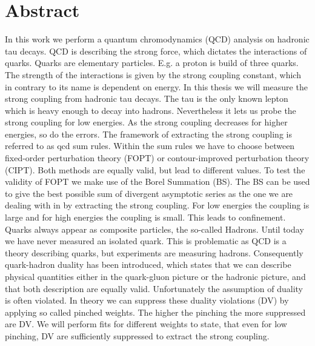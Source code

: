 \documentclass[11pt,a4paper]{article}
\begin{document}
\section*{Abstract}
In this work we perform a quantum chromodynamics (QCD) analysis on hadronic tau
decays. QCD is describing the strong force, which dictates the interactions of
quarks. Quarks are elementary particles. E.g. a proton is build of three quarks.
The strength of the interactions is given by the strong coupling constant, which
in contrary to its name is dependent on energy. In this thesis we will measure
the strong coupling from hadronic tau decays. The tau is the only known lepton
which is heavy enough to decay into hadrons. Nevertheless it lets us probe the
strong coupling for low energies. As the strong coupling decreases for higher
energies, so do the errors. The framework of extracting the strong coupling is
referred to as qcd sum rules. Within the sum rules we have to choose between
fixed-order perturbation theory (FOPT) or contour-improved perturbation theory
(CIPT). Both methods are equally valid, but lead to different values. To test
the validity of FOPT we make use of the Borel Summation (BS). The BS can be used
to give the best possible sum of divergent asymptotic series as the one we are
dealing with in by extracting the strong coupling. For low energies the coupling
is large and for high energies the coupling is small. This leads to confinement.
Quarks always appear as composite particles, the so-called Hadrons. Until today
we have never measured an isolated quark. This is problematic as QCD is a theory
describing quarks, but experiments are measuring hadrons. Consequently
quark-hadron duality has been introduced, which states that we can describe
physical quantities either in the quark-gluon picture or the hadronic picture,
and that both description are equally valid. Unfortunately the assumption of
duality is often violated. In theory we can suppress these duality violations
(DV) by applying so called pinched weights. The higher the pinching the more
suppressed are DV. We will perform fits for different weights to state, that
even for low pinching, DV are sufficiently suppressed to extract the strong
coupling.
\end{document}
